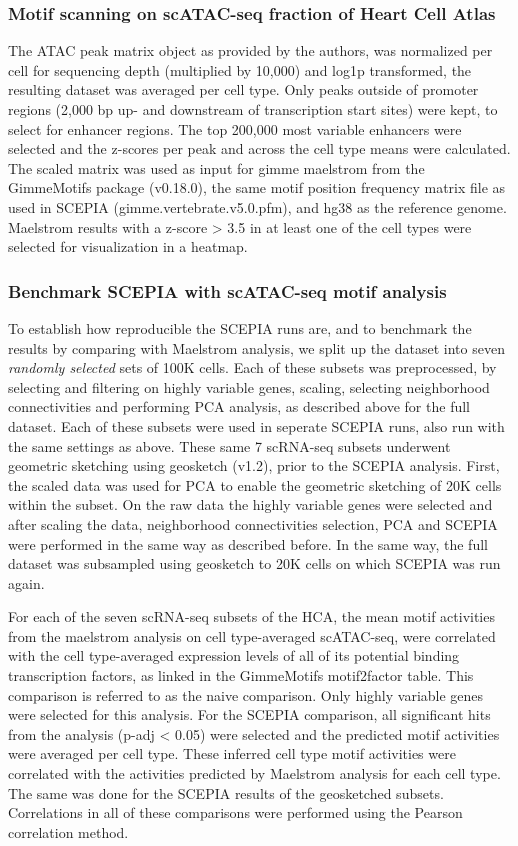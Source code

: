 \subsubsection{Motif scanning on scATAC-seq fraction of Heart Cell Atlas}

The ATAC peak matrix object as provided by the authors, was normalized per cell for sequencing depth (multiplied by 10,000) and log1p transformed, the resulting dataset was averaged per cell type. Only peaks outside of promoter regions (2,000 bp up- and downstream of transcription start sites) were kept, to select for enhancer regions. The top 200,000 most variable enhancers were selected and the z-scores per peak and across the cell type means were calculated. The scaled matrix was used as input for gimme maelstrom from the GimmeMotifs package (v0.18.0), the same motif position frequency matrix file as used in SCEPIA (gimme.vertebrate.v5.0.pfm), and hg38 as the reference genome. Maelstrom results with a z-score > 3.5 in at least one of the cell types were selected for visualization in a heatmap.

\subsubsection{Benchmark SCEPIA with scATAC-seq motif analysis}
To establish how reproducible the SCEPIA runs are, and to benchmark the results by comparing with Maelstrom analysis, we split up the dataset into seven \textit{randomly selected} sets of 100K cells. Each of these subsets was preprocessed, by selecting and filtering on highly variable genes, scaling, selecting neighborhood connectivities and performing PCA analysis, as described above for the full dataset. Each of these subsets were used in seperate SCEPIA runs, also run with the same settings as above. These same 7 scRNA-seq subsets underwent geometric sketching using geosketch (v1.2), prior to the SCEPIA analysis. First, the scaled data was used for PCA to enable the geometric sketching of 20K cells within the subset. On the raw data the highly variable genes were selected and after scaling the data, neighborhood connectivities selection, PCA and SCEPIA were performed in the same way as described before. In the same way, the full dataset was subsampled using geosketch to 20K cells on which SCEPIA was run again.

For each of the seven scRNA-seq subsets of the HCA, the mean motif activities from the maelstrom analysis on cell type-averaged scATAC-seq, were correlated with the cell type-averaged expression levels of all of its potential binding transcription factors, as linked in the GimmeMotifs motif2factor table. This comparison is referred to as the naive comparison. Only highly variable genes were selected for this analysis. For the SCEPIA comparison, all significant hits from the analysis (p-adj < 0.05) were selected and the predicted motif activities were averaged per cell type. These inferred cell type motif activities were correlated with the activities predicted by Maelstrom analysis for each cell type. The same was done for the SCEPIA results of the geosketched subsets. Correlations in all of these comparisons were performed using the Pearson correlation method.

